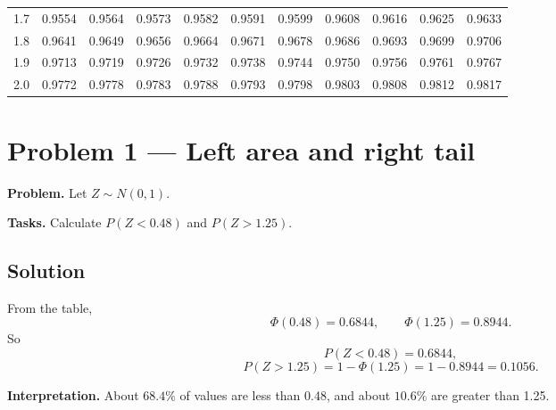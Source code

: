 \begin{center}
\begin{tabular}{c|cccccccccc}
1.7 & 0.9554 & 0.9564 & 0.9573 & 0.9582 & 0.9591 & 0.9599 & 0.9608 & 0.9616 & 0.9625 & 0.9633 \\
1.8 & 0.9641 & 0.9649 & 0.9656 & 0.9664 & 0.9671 & 0.9678 & 0.9686 & 0.9693 & 0.9699 & 0.9706 \\
1.9 & 0.9713 & 0.9719 & 0.9726 & 0.9732 & 0.9738 & 0.9744 & 0.9750 & 0.9756 & 0.9761 & 0.9767 \\
2.0 & 0.9772 & 0.9778 & 0.9783 & 0.9788 & 0.9793 & 0.9798 & 0.9803 & 0.9808 & 0.9812 & 0.9817 \\
\bottomrule
\end{tabular}
\end{center}

\section{Problem 1 --- Left area and right tail}
\textbf{Problem.}
Let \(Z\sim N(0,1)\).

\textbf{Tasks.}
Calculate \(P(Z<0.48)\) and \(P(Z>1.25)\).

\subsection*{Solution}
From the table,
\[
\Phi(0.48)=0.6844,
\qquad
\Phi(1.25)=0.8944.
\]
So
\[
P(Z<0.48)=0.6844,
\]
\[
P(Z>1.25)=1-\Phi(1.25)=1-0.8944=0.1056.
\]

\begin{center}
\end{center}

\textbf{Interpretation.} About \(68.4\%\) of values are less than 0.48, and about \(10.6\%\) are greater than 1.25.


